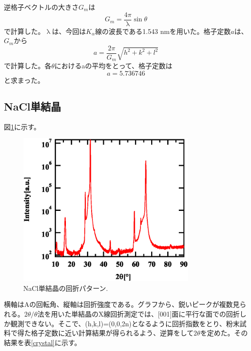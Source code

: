 \documentclass[11pt,a4j,uplatex]{jsarticle}
\begin{document}
\newpage
逆格子ベクトルの大きさ$G_{m}$は
\begin{equation}
 G_m=\frac{4\pi}{\uplambda}\sin\theta
 \label{gyakukousi}
\end{equation}
で計算した。$\uplambda$は、今回は$K_\alpha$線の波長である1.543 nmを用いた。格子定数$a$は、$G_{m}$から
\begin{equation}
 a=\frac{2\pi}{G_m}\sqrt{h^2+k^2+l^2}
 \label{kousiteisuu}
\end{equation}
で計算した。各$\theta$におけるaの平均をとって、格子定数は
\begin{equation}
 a=5.736746
 \label{complete}
\end{equation}
と求まった。

\newpage
\subsection{NaCl単結晶}

図\ref{bulk}に示す。

\begin{figure}[htb]
 \centering
 \includegraphics[clip,width=9cm]{FigBulk.eps}
 \caption{NaCl単結晶の回折パターン.}
 \label{bulk}
\end{figure}

横軸はAの回転角、縦軸は回折強度である。グラフから、鋭いピークが複数見られる。$2\theta/\theta$法を用いた単結晶のX線回折測定では、[001]面に平行な面での回折しか観測できない。そこで、(h,k,l)=(0,0,2n)となるように回折指数をとり、粉末試料で得た格子定数に近い計算結果が得られるよう、逆算をして$2\theta$を定めた。その結果を表\ref{crystal}に示す。
\end{document}
